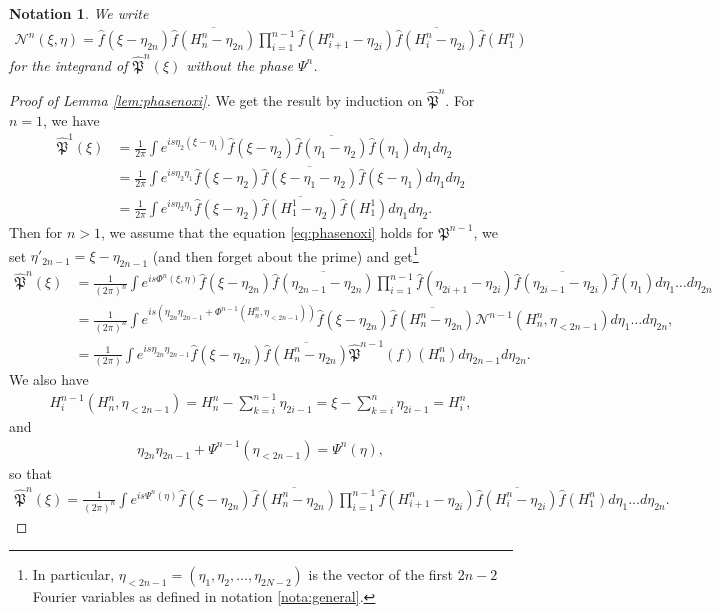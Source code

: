 \documentclass[a4paper, 15pt]{article}
\numberwithin{equation}{section}
\newtheorem{nota}[defi]{Notation}
\begin{document}
\begin{nota}
\label{nota:Nonlinearity}
We write 
\begin{align}
    \mathcal{N}^n(\xi,\eta)=\hat{f}(\xi-\eta_{2n})\overline{\hat{f}( H^n_{n}-\eta_{2n})}\prod^{n-1}_{i=1}\hat{f}(H^n_{i+1}-\eta_{2i})\overline{\hat{f}(H^n_{i}-\eta_{2i})}\hat{f}(H^n_1)
\end{align}
for the integrand of $\hat{\mathfrak{P}}^n(\xi)$ without the phase $\Psi^n$.
\end{nota}
\begin{proof}[Proof of Lemma \ref{lem:phasenoxi}]
We get the result by induction on $\hat{\mathfrak{P}}^n$. For $n=1$, we have 
\begin{align*}
    \hat{\mathfrak{P}}^1(\xi)&=\frac{1}{2\pi}\int e^{is\eta_2(\xi-\eta_1)}\hat{f}(\xi-\eta_{2})\overline{\hat{f}(\eta_{1}-\eta_{2})}\hat{f}(\eta_1)d\eta_1d\eta_{2}\\
    &=\frac{1}{2\pi}\int e^{is\eta_{2}\eta_{1}}\hat{f}(\xi-\eta_{2})\overline{\hat{f}(\xi-\eta_{1}-\eta_{2})}\hat{f}(\xi-\eta_1)d\eta_1 d\eta_{2}\\
    &=\frac{1}{2\pi}\int e^{is\eta_{2}\eta_{1}}\hat{f}(\xi-\eta_{2})\overline{\hat{f}(H^1_1-\eta_{2})}\hat{f}(H^1_1)d\eta_1 d\eta_{2}.
\end{align*}
Then for $n>1$, we assume that the equation \eqref{eq:phasenoxi} holds for $\mathfrak{P}^{n-1}$, we set $\eta'_{2n-1}=\xi-\eta_{2n-1}$ (and then forget about the prime) and get\footnote{In particular, $\eta_{<2n-1}=(\eta_1,\eta_2,\dots,\eta_{2N-2})$ is the vector of the first $2n-2$ Fourier variables as defined in notation \ref{nota:general}.}
\begin{align*}
   \hat{\mathfrak{P}}^n(\xi)&=\frac{1}{(2\pi)^n}\int e^{is\Phi^n(\xi,\eta)}\hat{f}(\xi-\eta_{2n})\overline{\hat{f}(\eta_{2n-1}-\eta_{2n})}\prod^{n-1}_{i=1}\hat{f}(\eta_{2i+1}-\eta_{2i})\overline{\hat{f}(\eta_{2i-1}-\eta_{2i})}\hat{f}(\eta_1)d\eta_1\dots d\eta_{2n}\\
    &=\frac{1}{(2\pi)^n}\int e^{is(\eta_{2n}\eta_{2n-1}+\Phi^{n-1}(H^n_n,\eta_{<2n-1}))}\hat{f}(\xi-\eta_{2n})\overline{\hat{f}(H^n_{n}-\eta_{2n})}\mathcal{N}^{n-1}(H^n_{n},\eta_{<2n-1})d\eta_1\dots d\eta_{2n},\\
    &=\frac{1}{(2\pi)}\int e^{is\eta_{2n}\eta_{2n-1}}\hat{f}(\xi-\eta_{2n})\overline{\hat{f}(H^n_{n}-\eta_{2n})}\hat{\mathfrak{P}}^{n-1}(f)(H^n_{n})d\eta_{2n-1} d\eta_{2n}.
\end{align*}
We also have  
\begin{align}
    H^{n-1}_i(H^n_n,\eta_{<2n-1})=H^n_n-\sum^{n-1}_{k=i}\eta_{2i-1}=\xi-\sum^{n}_{k=i}\eta_{2i-1}=H^n_{i},
\end{align}
and 
\begin{align*}
    \eta_{2n}\eta_{2n-1}+\Psi^{n-1}(\eta_{<2n-1})=\Psi^{n}(\eta),
\end{align*}
so that 
\begin{align*}
   \hat{\mathfrak{P}}^n(\xi)=\frac{1}{(2\pi)^n}\int e^{is\Psi^n(\eta)}\hat{f}(\xi-\eta_{2n})\overline{\hat{f}( H^n_{n}-\eta_{2n})}\prod^{n-1}_{i=1}\hat{f}(H^n_{i+1}-\eta_{2i})\overline{\hat{f}(H^n_{i}-\eta_{2i})}\hat{f}(H^n_1)d\eta_1\dots d\eta_{2n}.
\end{align*}
\end{proof}
\end{document}

